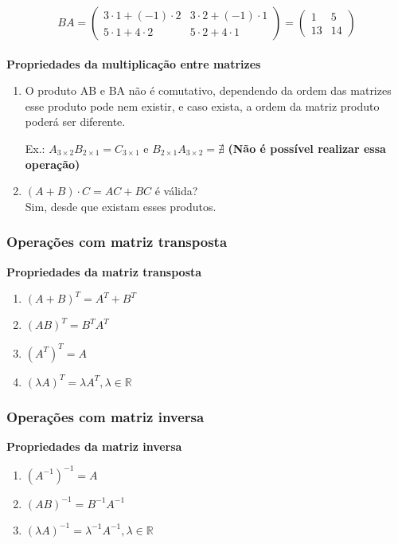 \documentclass[12pt]{article}
\begin{document}
\[
BA =
    \begin{pmatrix}
        3 \cdot 1 + (-1) \cdot 2 & 3 \cdot 2 + (-1) \cdot 1 \\
        5 \cdot 1 + 4 \cdot 2 & 5 \cdot 2 + 4 \cdot 1
    \end{pmatrix}
=
    \begin{pmatrix}
         1  &  5 \\
        13  &  14
    \end{pmatrix}
\]
\\
\noindent
\textbf{Propriedades da multiplicação entre matrizes}
\begin{enumerate}[label=\textbf{\alph*)}]
    \item O produto AB e BA não é comutativo, dependendo da ordem das matrizes esse produto pode nem existir,
    e caso exista, a ordem da matriz produto poderá ser diferente.

    Ex.: \( A_{3 \times 2} B_{2 \times 1} = C_{3 \times 1}\) e \( B_{2 \times 1} A_{3 \times 2} = \nexists\)
    \textbf{(Não é possível realizar essa operação)}
    \item \((A+B) \cdot C = AC+BC\) é válida? \\
    Sim, desde que existam esses produtos.
\end{enumerate}

\subsubsection{Operações com matriz transposta}
\noindent
\textbf{Propriedades da matriz transposta}
\begin{enumerate}[label=\textbf{\alph*)}]
    \item $(A + B)^T = A^T + B^T$
    \item $(AB)^T = B^T A^T$
    \item $(A^T)^T = A$
    \item $(\lambda A)^T = \lambda A^T, \lambda \in \mathbb{R}$
\end{enumerate}

\subsubsection{Operações com matriz inversa}
\noindent
\textbf{Propriedades da matriz inversa}
\begin{enumerate}[label=\textbf{\alph*)}]
    \item $(A^{-1})^{-1} = A$
    \item $(AB)^{-1} = B^{-1} A^{-1}$
    \item $(\lambda A)^{-1} = \lambda^{-1} A^{-1}, \lambda \in \mathbb{R}$
\end{enumerate}
\end{document}
